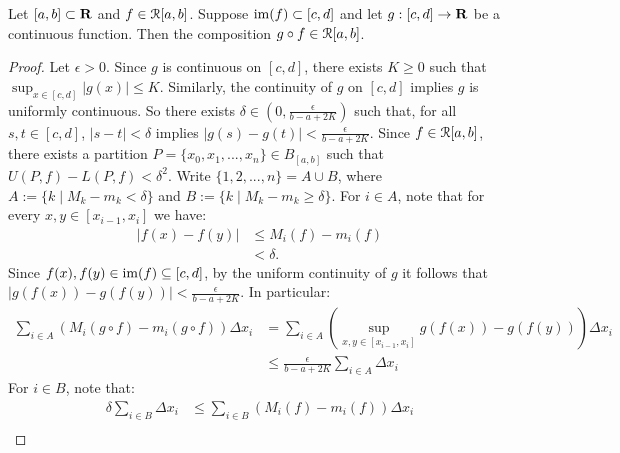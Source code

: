 \documentclass[10pt,twoside,openany]{memoir}
\begin{document}
    \begin{theorem}\label{thm:composition-of-inte}
        Let $[a,b] \subset \mathbf{R}$ and $f \in \mathcal{R}[a,b]$. Suppose $\operatorname{im}(f) \subset [c,d]$ and let $g:[c,d] \rightarrow \mathbf{R}$ be a continuous function. Then the composition $g \circ f \in \mathcal{R}[a,b]$.
    \end{theorem}
        \begin{proof}
            Let $\epsilon > 0$. Since $g$ is continuous on $[c,d]$, there exists $K \geq 0$ such that $\sup_{x \in [c,d]}|g(x)| \leq K$. Similarly, the continuity of $g$ on $[c,d]$ implies $g$ is uniformly continuous. So there exists $\delta \in \left(0, \frac{\epsilon}{b-a + 2K}\right)$ such that, for all $s,t \in [c,d]$, $|s-t| < \delta$ implies $|g(s)-g(t)| < \frac{\epsilon}{b-a + 2K}$.  Since $f \in \mathcal{R}[a,b]$, there exists a partition $P = \{x_0,x_1,...,x_n\} \in B_{[a,b]}$ such that $U(P,f) - L(P,f) < \delta^2$. Write $\{1,2,...,n\} = A \cup B$, where $A := \{k \mid M_k - m_k < \delta\}$ and $B := \{k \mid M_k - m_k \geq \delta\}$. For $i \in A$, note that for every $x,y \in [x_{i-1},x_i]$ we have:
                \begin{equation*}
                \begin{split}
                    |f(x) - f(y)|
                    & \leq M_i(f) - m_i(f) \\
                    & < \delta.
                \end{split}
                \end{equation*}
            Since $f(x),f(y) \in \operatorname{im}(f) \subseteq [c,d]$, by the uniform continuity of $g$ it follows that $|g(f(x)) - g(f(y))| < \frac{\epsilon}{b-a + 2K}$. In particular:
                \begin{equation*}
                \begin{split}
                    \sum_{i \in A}(M_i(g \circ f) - m_i(g \circ f))\Delta x_i 
                    & = \sum_{i \in A}\left(\sup_{x,y \in [x_{i-1},x_i]}g(f(x)) - g(f(y))\right)\Delta x_i \\
                    & \leq \frac{\epsilon}{b-a + 2K}\sum_{i \in A}\Delta x_i
                \end{split}
                \end{equation*}
            For $i \in B$, note that:
                \begin{equation*}
                \begin{split}
                    \delta\sum_{i \in B}\Delta x_i
                    & \leq \sum_{i \in B}(M_i(f) - m_i(f))\Delta x_i \\

\end{split}
\end{equation*}
\end{proof}
\end{document}
